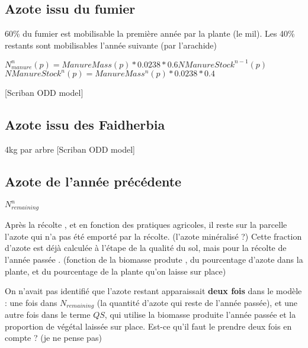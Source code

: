 \documentclass[10pt,a4paper,french]{article} %
\begin{document}
\subsection{Azote issu du fumier}


60\% du fumier est mobilisable la première année par la plante (le mil).
Les 40\% restants sont mobilisables l'année suivante (par l'arachide)


$N_{manure}^n(p)= ManureMass(p) * 0.0238 * 0.6 NManureStock^{n-1}(p)$
$NManureStock^{n}(p) = ManureMass^n(p)*  0.0238 * 0.4 $




[Scriban ODD model]




\subsection{Azote issu des Faidherbia}


4kg par arbre [Scriban ODD model]





\subsection{Azote de l'année précédente}



$N_{remaining}^n$


Après la récolte , et en fonction des pratiques agricoles, il reste sur la parcelle l'azote qui n'a pas été emporté par la récolte. (l'azote minéralisé ?)
Cette fraction d'azote est déjà calculée à l'étape de la qualité du sol, mais pour la récolte de l'année passée . (fonction de la biomasse produte , du pourcentage d'azote dans la plante, et du pourcentage de la plante qu'on laisse sur place) 



\begin{tcolorbox}[noparskip,
    colback=LightGreen,colframe=DarkGreen,%
    colbacklower=LimeGreen!75!LightGreen,%
    title=Question]
On n'avait pas identifié que l'azote restant apparaissait \textbf{deux fois} dans le modèle : une fois dans $N_{remaining}$ (la quantité d'azote qui reste de l'année passée), et une autre fois dans le terme $QS$, qui utilise la biomasse produite l'année passée et la proportion de végétal laissée sur place. Est-ce qu'il faut le prendre deux fois en compte ? (je ne pense pas)
\end{tcolorbox}
\end{document}
